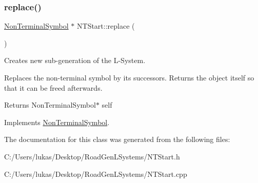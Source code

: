 \subsubsection{\texorpdfstring{replace()}{replace()}}
{\footnotesize\ttfamily \hyperlink{class_non_terminal_symbol}{Non\+Terminal\+Symbol} $\ast$ N\+T\+Start\+::replace (\begin{DoxyParamCaption}{ }\end{DoxyParamCaption})\hspace{0.3cm}{\ttfamily [virtual]}}



Creates new sub-\/generation of the L-\/\+System. 

Replaces the non-\/terminal symbol by its successors. Returns the object itself so that it can be freed afterwards.

\begin{DoxyReturn}{Returns}
Non\+Terminal\+Symbol$\ast$ self 
\end{DoxyReturn}


Implements \hyperlink{class_non_terminal_symbol_ade38f1475002e4f8b41e23d9c787e5e0}{Non\+Terminal\+Symbol}.



The documentation for this class was generated from the following files\+:\begin{DoxyCompactItemize}
\item 
C\+:/\+Users/lukas/\+Desktop/\+Road\+Gen\+L\+Systems/N\+T\+Start.\+h\item 
C\+:/\+Users/lukas/\+Desktop/\+Road\+Gen\+L\+Systems/N\+T\+Start.\+cpp\end{DoxyCompactItemize}
